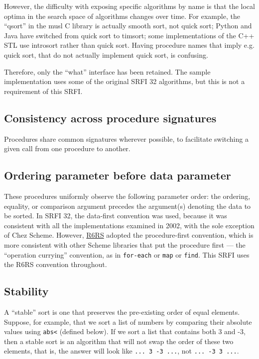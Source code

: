 However, the difficulty with exposing specific algorithms by name is
that the local optima in the search space of algorithms changes over
time. For example, the ``qsort'' in the musl C library is actually
smooth sort, not quick sort; Python and Java have switched from quick
sort to timsort; some implementations of the C++ STL use introsort
rather than quick sort. Having procedure names that imply e.g. quick
sort, that do not actually implement quick sort, is confusing.

Therefore, only the ``what'' interface has been retained. The sample
implementation uses some of the original SRFI 32 algorithms, but this is
not a requirement of this SRFI.

\subsection{Consistency across procedure
signatures}\label{Consistencyacrossproceduresignatures}

Procedures share common signatures wherever possible, to facilitate
switching a given call from one procedure to another.

\subsection{Ordering parameter before data
parameter}\label{Orderingparameterbeforedataparameter}

These procedures uniformly observe the following parameter order: the
ordering, equality, or comparison argument precedes the argument(s)
denoting the data to be sorted. In SRFI 32, the data-first convention
was used, because it was consistent with all the implementations
examined in 2002, with the sole exception of Chez Scheme. However,
\href{http://www.r6rs.org/final/html/r6rs-lib/r6rs-lib-Z-H-5.html\#node_chap_4}{R6RS}
adopted the procedure-first convention, which is more consistent with
other Scheme libraries that put the procedure first --- the ``operation
currying'' convention, as in \texttt{for-each} or \texttt{map} or
\texttt{find}. This SRFI uses the R6RS convention throughout.

\subsection{Stability}\label{Stability}

A ``stable'' sort is one that preserves the pre-existing order of equal
elements. Suppose, for example, that we sort a list of numbers by
comparing their absolute values using \texttt{abs\textless{}} (defined
below). If we sort a list that contains both 3 and -3, then a stable
sort is an algorithm that will not swap the order of these two elements,
that is, the answer will look like \texttt{...\ 3\ -3\ ...}, not
\texttt{...\ -3\ 3\ ...}.

